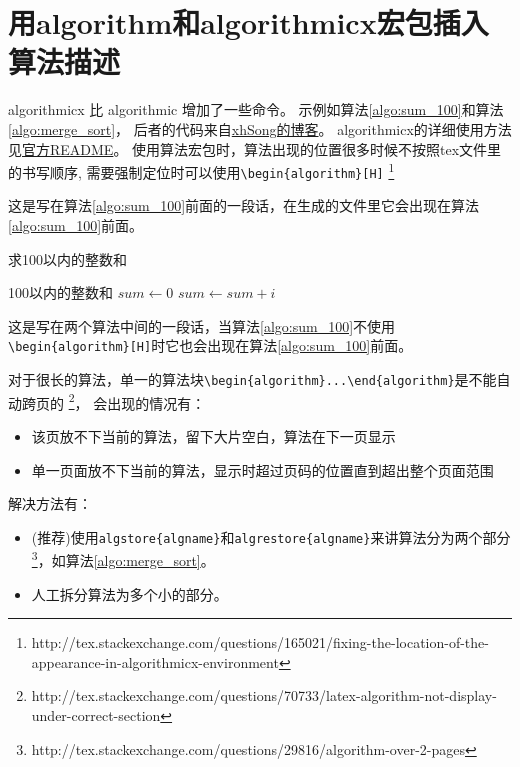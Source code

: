 \documentclass[doctor,openright,twoside]{sjtuthesis}
\theoremstyle{plain}
\theoremstyle{definition}
\theoremstyle{remark}
\theoremstyle{ocrenumbox}
\theoremstyle{plain}
\begin{document}
\section{用algorithm和algorithmicx宏包插入算法描述}

algorithmicx 比 algorithmic 增加了一些命令。
示例如算法\ref{algo:sum_100}和算法\ref{algo:merge_sort}，
后者的代码来自\href{http://hustsxh.is-programmer.com/posts/38801.html}{xhSong的博客}。
algorithmicx的详细使用方法见\href{http://mirror.hust.edu.cn/CTAN/macros/latex/contrib/algorithmicx/algorithmicx.pdf}{官方README}。
使用算法宏包时，算法出现的位置很多时候不按照tex文件里的书写顺序,
需要强制定位时可以使用\verb+\begin{algorithm}[H]+
\footnote{http://tex.stackexchange.com/questions/165021/fixing-the-location-of-the-appearance-in-algorithmicx-environment}

这是写在算法\ref{algo:sum_100}前面的一段话，在生成的文件里它会出现在算法\ref{algo:sum_100}前面。

\begin{algorithm}
\caption{求100以内的整数和}
\label{algo:sum_100}
\begin{algorithmic}[1] %
\Ensure 100以内的整数和 %
\State $sum \gets 0$
    \State $sum \gets sum + i$
  \EndFor
\end{algorithmic}
\end{algorithm}

这是写在两个算法中间的一段话，当算法\ref{algo:sum_100}不使用\verb+\begin{algorithm}[H]+时它也会出现在算法\ref{algo:sum_100}前面。

对于很长的算法，单一的算法块\verb+\begin{algorithm}...\end{algorithm}+是不能自动跨页的
\footnote{http://tex.stackexchange.com/questions/70733/latex-algorithm-not-display-under-correct-section}，
会出现的情况有：

\begin{itemize}
  \item 该页放不下当前的算法，留下大片空白，算法在下一页显示
  \item 单一页面放不下当前的算法，显示时超过页码的位置直到超出整个页面范围
\end{itemize}

解决方法有：

\begin{itemize}
  \item (推荐)使用\verb+algstore{algname}+和\verb+algrestore{algname}+来讲算法分为两个部分\footnote{http://tex.stackexchange.com/questions/29816/algorithm-over-2-pages}，如算法\ref{algo:merge_sort}。
  \item 人工拆分算法为多个小的部分。
\end{itemize}
\end{document}
